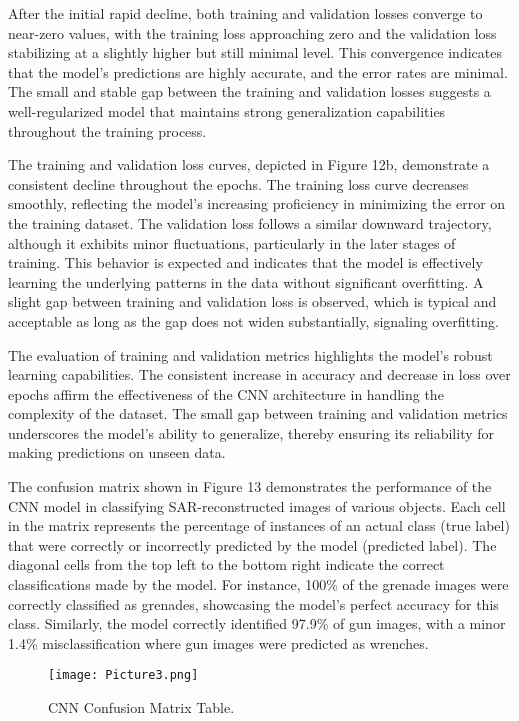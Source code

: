 \documentclass[journal,article,submit,pdftex,moreauthors]{Definitions/mdpi}
\begin{document}
After the initial rapid decline, both training and validation losses converge to near-zero values, with the training loss approaching zero and the validation loss stabilizing at a slightly higher but still minimal level. This convergence indicates that the model's predictions are highly accurate, and the error rates are minimal. The small and stable gap between the training and validation losses suggests a well-regularized model that maintains strong generalization capabilities throughout the training process. 

The training and validation loss curves, depicted in Figure 12b, demonstrate a consistent decline throughout the epochs. The training loss curve decreases smoothly, reflecting the model's increasing proficiency in minimizing the error on the training dataset. The validation loss follows a similar downward trajectory, although it exhibits minor fluctuations, particularly in the later stages of training. This behavior is expected and indicates that the model is effectively learning the underlying patterns in the data without significant overfitting. A slight gap between training and validation loss is observed, which is typical and acceptable as long as the gap does not widen substantially, signaling overfitting.



The evaluation of training and validation metrics highlights the model's robust learning capabilities. The consistent increase in accuracy and decrease in loss over epochs affirm the effectiveness of the CNN architecture in handling the complexity of the dataset. The small gap between training and validation metrics underscores the model's ability to generalize, thereby ensuring its reliability for making predictions on unseen data.

The confusion matrix shown in Figure 13 demonstrates the performance of the CNN model in classifying SAR-reconstructed images of various objects. Each cell in the matrix represents the percentage of instances of an actual class (true label) that were correctly or incorrectly predicted by the model (predicted label). The diagonal cells from the top left to the bottom right indicate the correct classifications made by the model. For instance, 100\% of the grenade images were correctly classified as grenades, showcasing the model's perfect accuracy for this class. Similarly, the model correctly identified 97.9\% of gun images, with a minor 1.4\% misclassification where gun images were predicted as wrenches.
\begin{figure}[h]
  \centering
  \texttt{[image: Picture3.png]}
  \caption{CNN Confusion Matrix Table.}
  \label{Figure:}
\end{figure}
\end{document}
